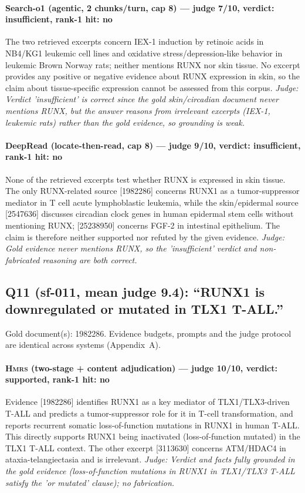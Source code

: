\documentclass[sigconf, review, anonymous]{acmart}
\begin{document}
\paragraph{Search-o1 (agentic, 2 chunks/turn, cap 8) --- judge 7/10, verdict: insufficient, rank-1 hit: no}
\noindent The two retrieved excerpts concern IEX-1 induction by retinoic acids in NB4/KG1 leukemic cell lines and oxidative stress/depression-like behavior in leukemic Brown Norway rats; neither mentions RUNX nor skin tissue. No excerpt provides any positive or negative evidence about RUNX expression in skin, so the claim about tissue-specific expression cannot be assessed from this corpus.
\noindent\small\textit{Judge: Verdict 'insufficient' is correct since the gold skin/circadian document never mentions RUNX, but the answer reasons from irrelevant excerpts (IEX-1, leukemic rats) rather than the gold evidence, so grounding is weak.}
\paragraph{DeepRead (locate-then-read, cap 8) --- judge 9/10, verdict: insufficient, rank-1 hit: no}
\noindent None of the retrieved excerpts test whether RUNX is expressed in skin tissue. The only RUNX-related source [1982286] concerns RUNX1 as a tumor-suppressor mediator in T cell acute lymphoblastic leukemia, while the skin/epidermal source [2547636] discusses circadian clock genes in human epidermal stem cells without mentioning RUNX; [25238950] concerns FGF-2 in intestinal epithelium. The claim is therefore neither supported nor refuted by the given evidence.
\noindent\small\textit{Judge: Gold evidence never mentions RUNX, so the 'insufficient' verdict and non-fabricated reasoning are both correct.}

\subsection{Q11 (sf-011, mean judge 9.4): ``RUNX1 is downregulated or mutated in TLX1 T-ALL.''}
\label{app:q11}
\noindent Gold document(s): 1982286. Evidence budgets, prompts and the judge protocol are identical across systems (Appendix~A).
\paragraph{\textbf{\textsc{Hmrs}} (two-stage + content adjudication) --- judge 10/10, verdict: supported, rank-1 hit: no}
\noindent Evidence [1982286] identifies RUNX1 as a key mediator of TLX1/TLX3-driven T-ALL and predicts a tumor-suppressor role for it in T-cell transformation, and reports recurrent somatic loss-of-function mutations in RUNX1 in human T-ALL. This directly supports RUNX1 being inactivated (loss-of-function mutated) in the TLX1 T-ALL context. The other excerpt [3113630] concerns ATM/HDAC4 in ataxia-telangiectasia and is irrelevant.
\noindent\small\textit{Judge: Verdict and facts fully grounded in the gold evidence (loss-of-function mutations in RUNX1 in TLX1/TLX3 T-ALL satisfy the 'or mutated' clause); no fabrication.}
\end{document}
